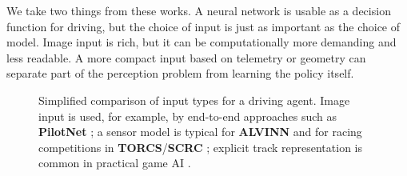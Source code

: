 We take two things from these works. A neural network is usable as a decision function for driving, but the choice of input is just as important as the choice of model. Image input is rich, but it can be computationally more demanding and less readable. A more compact input based on telemetry or geometry can separate part of the perception problem from learning the policy itself.

\begin{figure}[htbp]
    \centering
    \setlength{\fboxsep}{6pt}
    \begin{minipage}{0.31\textwidth}
        \centering
    \end{minipage}\hfill
    \begin{minipage}{0.31\textwidth}
        \centering
    \end{minipage}\hfill
    \begin{minipage}{0.31\textwidth}
        \centering
    \end{minipage}
    \caption[Input types for a driving agent]{Simplified comparison of input types for a driving agent. Image input is used, for example, by end-to-end approaches such as \textbf{PilotNet} \cite{bojarski2016endtoend}; a sensor model is typical for \textbf{ALVINN} and for racing competitions in \textbf{TORCS}/\textbf{SCRC} \cite{pomerleau1989alvinn, loiacono2010scrc}; explicit track representation is common in practical game AI \cite{game_ai_pro_racetrack2013}.}
    \label{fig:related_input_types}
\end{figure}

